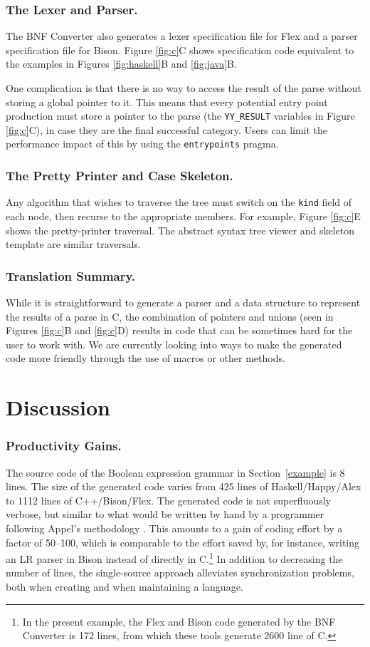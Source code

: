 \documentclass{llncs}
\newcommand{\shortsection}[1]{\subsubsection*{#1.}} %
\begin{document}
\shortsection{The Lexer and Parser}

The BNF Converter also generates a lexer specification file for Flex and a parser specification file for Bison. Figure \ref{fig:c}C shows specification code equivalent to the examples in Figures \ref{fig:haskell}B and \ref{fig:java}B.

One complication is that there is no way to access the result of the parse without storing a global pointer to it. This means that every potential entry point production must store a pointer to the parse (the \texttt{YY\_RESULT} variables in Figure \ref{fig:c}C),
in case they are the final successful category. Users can limit the performance impact of this by using the \texttt{entrypoints} pragma.

\shortsection{The Pretty Printer and Case Skeleton}

Any algorithm that wishes to traverse the tree must switch on the \texttt{kind} field of each node, then recurse to the appropriate members. For example, Figure \ref{fig:c}E shows the pretty-printer traversal. The abstract syntax tree viewer and skeleton template are similar traversals.

\shortsection{Translation Summary}

While it is straightforward to generate a parser and a data structure to represent the results of a parse in C, the combination of pointers and unions (seen in Figures \ref{fig:c}B and \ref{fig:c}D) results in code that can be sometimes hard for the user to work with. We are currently looking into ways to make the generated code more friendly through the use of macros or other methods.




\section{Discussion}

\shortsection{Productivity Gains}

The source code of the Boolean expression grammar in Section~\ref{example} is
8 lines. The size of the generated code varies from 425 lines of 
Haskell/Happy/Alex to 
1112 lines of C++/Bison/Flex. The generated code is not superfluously verbose, but
similar to what would be written by hand by a programmer following
Appel's methodology \cite{AppelC,AppelJ,appel}. 
This amounts to a gain of coding effort by
a factor of 50--100, which is comparable to the effort saved by,
for instance, writing an LR parser in Bison instead of directly in C.\footnote{
In the present example, the Flex and Bison code generated by the BNF Converter 
is 172 lines, from which these tools generate 2600 line of C.
}
In addition to decreasing the number of lines, the single-source
approach alleviates synchronization problems, both when creating and 
when maintaining a language.
\end{document}
